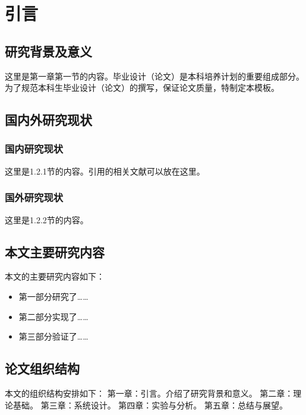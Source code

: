 \chapter{引言}
\label{chap:intro}

\section{研究背景及意义}
这里是第一章第一节的内容。毕业设计（论文）是本科培养计划的重要组成部分。为了规范本科生毕业设计（论文）的撰写，保证论文质量，特制定本模板\cite{rabiner1989tutorial}。

\section{国内外研究现状}
\subsection{国内研究现状}
这里是1.2.1节的内容。引用的相关文献可以放在这里\cite{hinton2012deep}。

\subsection{国外研究现状}
这里是1.2.2节的内容。

\section{本文主要研究内容}
本文的主要研究内容如下：
\begin{itemize}
    \item 第一部分研究了……
    \item 第二部分实现了……
    \item 第三部分验证了……
\end{itemize}

\section{论文组织结构}
本文的组织结构安排如下：
第一章：引言。介绍了研究背景和意义。
第二章：理论基础。
第三章：系统设计。
第四章：实验与分析。
第五章：总结与展望。
